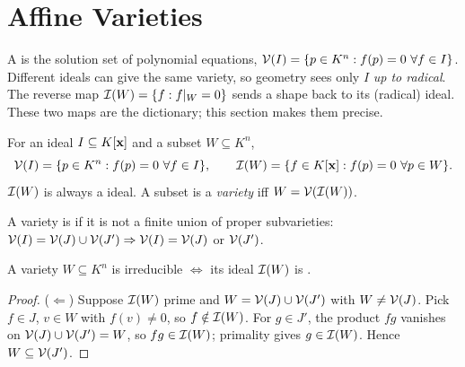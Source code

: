 \section{Affine Varieties}\label{sec:affine}
\quad{}

\begin{strand}
A  is the solution set of polynomial equations,
$\mathcal{V}(I)=\{p\in K^n: f(p)=0\ \forall f\in I\}$. Different ideals can give the same variety, so geometry
sees only $I$ \emph{up to radical}. The reverse map $\mathcal{I}(W)=\{f:f|_W=0\}$ sends a shape back to its
(radical) ideal. These two maps are the dictionary; this section makes them precise.
\end{strand}


\begin{definition}\label{def:VandI}
For an ideal $I\subseteq K[\mathbf{x}]$ and a subset $W\subseteq K^n$,
\[
  \mathcal{V}(I)=\{p\in K^n: f(p)=0\ \forall f\in I\},\qquad
  \mathcal{I}(W)=\{f\in K[\mathbf{x}]: f(p)=0\ \forall p\in W\}.
\]
$\mathcal{I}(W)$ is always a  ideal. A subset is a \emph{variety} iff $W=\mathcal{V}(\mathcal{I}(W))$.
\end{definition}



\begin{definition}[irreducible]
A variety is  if it is not a finite union of proper subvarieties:
$\mathcal{V}(I)=\mathcal{V}(J)\cup\mathcal{V}(J')\Rightarrow\mathcal{V}(I)=\mathcal{V}(J)$ or $\mathcal{V}(J')$.
\end{definition}

\begin{proposition}[Prop.\ 2.3]\label{prop:irr-prime}
A variety $W\subseteq K^n$ is irreducible \;$\iff$\; its ideal $\mathcal{I}(W)$ is \fillin[2.5cm].
\end{proposition}
\begin{proof}
($\Leftarrow$) Suppose $\mathcal{I}(W)$ prime and $W=\mathcal{V}(J)\cup\mathcal{V}(J')$ with $W\ne\mathcal{V}(J)$. Pick $f\in J$,
$v\in W$ with $f(v)\ne0$, so $f\notin\mathcal{I}(W)$. For $g\in J'$, the product $fg$ vanishes on
$\mathcal{V}(J)\cup\mathcal{V}(J')=W$, so $fg\in\mathcal{I}(W)$; primality gives $g\in\mathcal{I}(W)$. Hence $W\subseteq\mathcal{V}(J')$.
\end{proof}

